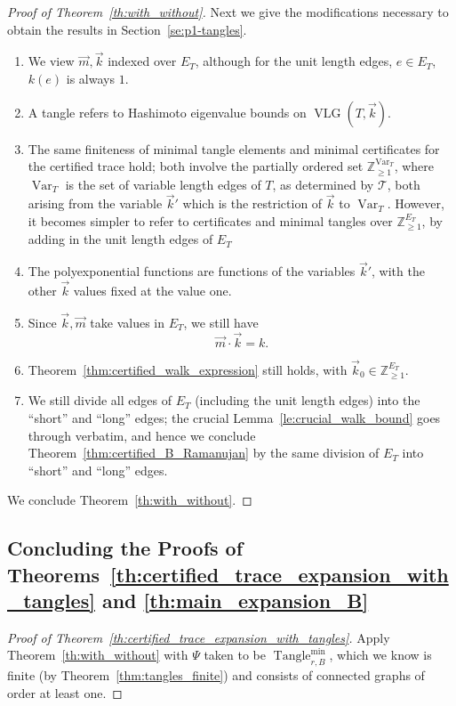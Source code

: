 \documentclass{memo-l}
\DeclareMathOperator{\Var}{Var}
\theoremstyle{plain}
\theoremstyle{definition}
\numberwithin{section}{chapter}
\numberwithin{equation}{chapter}
\newcommand{\integers}{{\mathbb Z}}
\DeclareMathOperator{\VLG}{VLG}
\DeclareMathOperator{\Tangle}{Tangle}
\newcommand{\Tanglemin}{\Tangle_{r,B}^{\min}}
\theoremstyle{plain}
\theoremstyle{definition}
\newcommand\cT{\mathcal{T}}
\begin{document}
\begin{proof}[Proof of Theorem~\ref{th:with_without}]
Next we give the modifications necessary to obtain the results in
Section~\ref{se:p1-tangles}.
\begin{enumerate}
\item We view $\vec m,\vec k$ indexed over $E_T$, although for the
unit length edges, $e\in E_T$, $k(e)$ is always $1$.
\item A tangle refers to Hashimoto eigenvalue bounds on
$\VLG(T,\vec k)$.
\item The same finiteness of minimal tangle elements and
minimal certificates for the certified trace hold; both involve the
partially ordered set $\integers_{\ge 1}^{\Var_T}$, where $\Var_T$
is the set of variable length edges of $T$, as determined by $\cT$,
both arising from the variable $\vec k'$ which is the restriction of
$\vec k$ to $\Var_T$.  However, it becomes simpler to refer to
certificates and minimal tangles 
over $\integers_{\ge 1}^{E_T}$, by adding in the unit
length edges of $E_T$
\item The polyexponential functions are functions of the variables
$\vec k'$, with the other $\vec k$ values fixed at the value one.
\item Since $\vec k,\vec m$ take values in $E_T$, we still have
$$
\vec m\cdot\vec k = k .
$$
\item Theorem~\ref{thm:certified_walk_expression} still holds,
with $\vec k_0\in\integers_{\ge 1}^{E_T}$.
\item We still divide all edges of $E_T$ (including the unit length
edges) into the ``short'' and ``long'' edges; the crucial
Lemma~\ref{le:crucial_walk_bound} goes through verbatim,
and hence we conclude Theorem~\ref{thm:certified_B_Ramanujan} by
the same division of $E_T$ into ``short'' and ``long'' edges.
\end{enumerate}

We conclude 
Theorem~\ref{th:with_without}.

\end{proof}


\subsection{Concluding the Proofs of 
Theorems~\ref{th:certified_trace_expansion_with_tangles}
and \ref{th:main_expansion_B}}

\begin{proof}[Proof of 
Theorem~\ref{th:certified_trace_expansion_with_tangles}]
Apply Theorem~\ref{th:with_without} with
$\Psi$ taken to be $\Tanglemin$, which we know is finite
(by Theorem~\ref{thm:tangles_finite}) and consists of connected graphs
of order at least one.
\end{proof}
\end{document}
